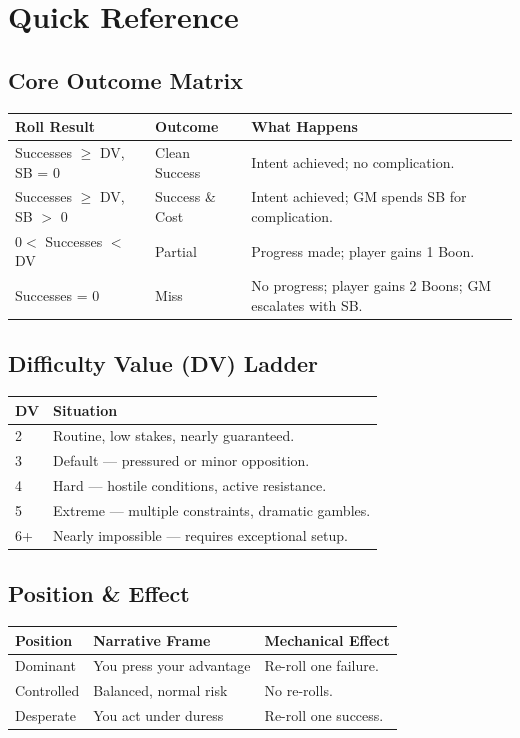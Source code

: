 
\appendix
\section{Quick Reference}

\subsection{Core Outcome Matrix}

\begin{tabular}{@{}llp{6cm}@{}}
\toprule
\textbf{Roll Result} & \textbf{Outcome} & \textbf{What Happens} \\
\midrule
Successes $\ge$ DV, SB = 0 & Clean Success & Intent achieved; no complication. \\
Successes $\ge$ DV, SB $>$ 0 & Success \& Cost & Intent achieved; GM spends SB for complication. \\
$0 <$ Successes $<$ DV & Partial & Progress made; player gains 1 Boon. \\
Successes = 0 & Miss & No progress; player gains 2 Boons; GM escalates with SB. \\
\bottomrule
\end{tabular}

\subsection{Difficulty Value (DV) Ladder}

\begin{tabular}{@{}ll@{}}
\toprule
\textbf{DV} & \textbf{Situation} \\
\midrule
2 & Routine, low stakes, nearly guaranteed. \\
3 & Default --- pressured or minor opposition. \\
4 & Hard --- hostile conditions, active resistance. \\
5 & Extreme --- multiple constraints, dramatic gambles. \\
6+ & Nearly impossible --- requires exceptional setup. \\
\bottomrule
\end{tabular}

\subsection{Position \& Effect}

\begin{tabular}{@{}lll@{}}
\toprule
\textbf{Position} & \textbf{Narrative Frame} & \textbf{Mechanical Effect} \\
\midrule
Dominant & You press your advantage & Re-roll one failure. \\
Controlled & Balanced, normal risk & No re-rolls. \\
Desperate & You act under duress & Re-roll one success. \\
\bottomrule
\end{tabular}

